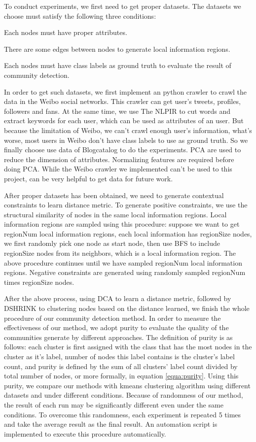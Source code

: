 To conduct experiments, we first need to get proper datasets.
The datasets we choose must satisfy the following three conditions:
\begin{inparaenum}[i)]
    \item Each nodes must have proper attributes.
    \item There are some edges between nodes to generate local information regions.
    \item Each nodes must have class labels as ground truth to evaluate the result of community detection.
\end{inparaenum}
In order to get such datasets, we first implement an python crawler to 
crawl the data in the Weibo social networks. This crawler can get user's 
tweets, profiles, followers and fans. At the same time, we use The NLPIR to cut words
and extract keywords for each user, which can be used as attributes of an user.
But because the limitation of Weibo, we can't crawl enough user's information,
what's worse, most users in Weibo don't have class labels to use as ground truth.   
So we finally choose use data of Blogcatalog to do the experiments. 
PCA are used to reduce the dimension of attributes. Normalizing features
are required before doing PCA.
While the Weibo crawler we implemented can't be used to this project,
can be very helpful to get data for future work.

After proper datasets has been obtained, we need to generate contextual constraints 
to learn distance metric. To generate positive constraints, 
we use the structural similarity of nodes in the same local information regions.  
Local information regions are sampled using this procedure:
suppose we want to get regionNum local information regions, each local information has 
regionSize nodes, we first randomly pick one node as start node, then use BFS to include 
regionSize nodes from its neighbors, which is a local information region. The above procedure continues until we have sampled 
regionNum local information regions. Negative constraints are generated using 
randomly sampled regionNum times regionSize nodes.

After the above process, using DCA to learn a distance metric, followed by DSHRINK to clustering nodes 
based on the distance learned, we finish the whole procedure of our community detection method.
In order to measure the effectiveness of our method, we adopt purity to evaluate the quality of the 
communities generate by different approaches. The definition of purity is as follows:
each cluster is first assigned with the class that has the most nodes in the cluster as it's label,
number of nodes this label contains is the cluster's label count,
and purity is defined by the sum of all clusters' label count divided by total number of nodes, 
or more formally, in equation \ref{equa:purity}. Using this purity, 
we compare our methods with kmeans clustering algorithm using different datasets 
and under different conditions. Because of randomness of our method, 
the result of each run may be significantly different even under the same conditions.  
To overcome this randomness, each experiment is repeated 5 times and take the 
average result as the final result.
An automation script is implemented to execute this procedure automatically.  

